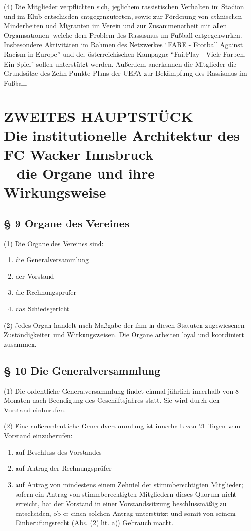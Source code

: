 \documentclass[10pt,a4paper]{article}
\begin{document}
(4)
Die Mitglieder verpflichten sich, jeglichem rassistischen Verhalten im Stadion und im Klub entschieden entgegenzutreten, sowie zur Förderung von ethnischen Minderheiten und Migranten im Verein und zur Zusammenarbeit mit allen Organisationen, welche dem Problem des Rassismus im Fußball entgegenwirken.
Insbesondere Aktivitäten im Rahmen des Netzwerkes "`FARE - Football Against Racism in Europe"' und der österreichischen Kampagne "`FairPlay - Viele Farben. Ein Spiel"' sollen unterstützt werden.
Außerdem anerkennen die Mitglieder die Grundsätze des Zehn Punkte Plans der UEFA zur Bekämpfung des Rassismus im Fußball.

\section{ZWEITES HAUPTSTÜCK\\Die institutionelle Architektur des FC Wacker Innsbruck\\– die Organe und ihre Wirkungsweise}

\subsection{§ 9
Organe des Vereines}
(1)
Die Organe des Vereines sind:

\begin{enumerate}[label=\alph*)]
\item
die Generalversammlung
\item
der Vorstand
\item
die Rechnungsprüfer
\item
das Schiedsgericht
\end{enumerate}

(2)
Jedes Organ handelt nach Maßgabe der ihm in diesen Statuten zugewiesenen Zuständigkeiten und Wirkungsweisen.
Die Organe arbeiten loyal und koordiniert zusammen.

\subsection{§ 10
Die Generalversammlung}

(1)
Die ordentliche Generalversammlung findet einmal jährlich innerhalb von 8 Monaten nach Beendigung des Geschäftsjahres statt.
Sie wird durch den Vorstand einberufen.

(2)
Eine außerordentliche Generalversammlung ist innerhalb von 21 Tagen vom Vorstand einzuberufen:

\begin{enumerate}[label=\alph*)]
\item
auf Beschluss des Vorstandes
\item
auf Antrag der Rechnungsprüfer
\item
auf Antrag von mindestens einem Zehntel der stimmberechtigten Mitglieder;
sofern ein Antrag von stimmberechtigten Mitgliedern dieses Quorum nicht erreicht, hat der Vorstand in einer Vorstandssitzung beschlussmäßig zu entscheiden, ob er einen solchen Antrag unterstützt und somit von seinem Einberufungsrecht (Abs. (2) lit. a)) Gebrauch macht.
\end{enumerate}
\end{document}
